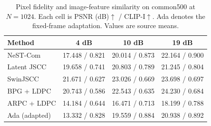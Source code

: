 \begin{table}[t]
\caption{Pixel fidelity and image-feature similarity on common500 at $N=1024$. Each cell is PSNR (dB)$\uparrow$ / CLIP-I$\uparrow$. Ada denotes the fixed-frame adaptation. Values are source means.}
\label{tab:external}
\centering\footnotesize
\setlength{\tabcolsep}{3pt}
\begin{tabular}{lccc}
\toprule Method & 4 dB & 10 dB & 19 dB \\
\midrule
NeST-Com & 17.448 / 0.821 & 20.014 / 0.873 & 22.164 / 0.900 \\
Latent JSCC & 19.658 / 0.741 & 20.803 / 0.789 & 21.245 / 0.804 \\
SwinJSCC & 21.671 / 0.627 & 23.026 / 0.669 & 23.698 / 0.697 \\
BPG + LDPC & 20.743 / 0.586 & 22.543 / 0.635 & 24.230 / 0.684 \\
ARPC + LDPC & 14.184 / 0.644 & 16.471 / 0.713 & 18.199 / 0.788 \\
Ada (adapted) & 13.332 / 0.828 & 19.559 / 0.884 & 20.938 / 0.892 \\
\bottomrule
\end{tabular}
\end{table}

